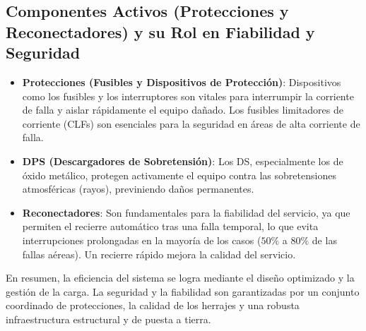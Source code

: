 \subsection*{Componentes Activos (Protecciones y Reconectadores) y su Rol en Fiabilidad y Seguridad}
\begin{itemize}
    \item \textbf{Protecciones (Fusibles y Dispositivos de Protección)}: Dispositivos como los fusibles y los interruptores son vitales para interrumpir la corriente de falla y aislar rápidamente el equipo dañado. Los fusibles limitadores de corriente (CLFs) son esenciales para la seguridad en áreas de alta corriente de falla.
    \item \textbf{DPS (Descargadores de Sobretensión)}: Los DS, especialmente los de óxido metálico, protegen activamente el equipo contra las sobretensiones atmosféricas (rayos), previniendo daños permanentes.
    \item \textbf{Reconectadores}: Son fundamentales para la fiabilidad del servicio, ya que permiten el recierre automático tras una falla temporal, lo que evita interrupciones prolongadas en la mayoría de los casos ($50\%$ a $80\%$ de las fallas aéreas). Un recierre rápido mejora la calidad del servicio.
\end{itemize}

En resumen, la eficiencia del sistema se logra mediante el diseño optimizado y la gestión de la carga. La seguridad y la fiabilidad son garantizadas por un conjunto coordinado de protecciones, la calidad de los herrajes y una robusta infraestructura estructural y de puesta a tierra.
